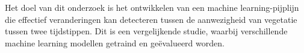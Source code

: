 
\chapter{}%
\label{ch:methodologie}



Het doel van dit onderzoek is het ontwikkelen van een machine learning-pijplijn die effectief veranderingen 
kan detecteren tussen de aanwezigheid van vegetatie tussen twee tijdstippen. Dit is een vergelijkende studie, 
waarbij verschillende machine learning modellen getraind en geëvalueerd worden.
\newline
